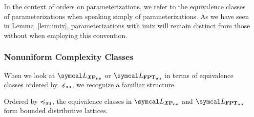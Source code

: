 In the context of orders on parameterizations, we refer to the equivalence classes of parameterizations when speaking simply of parameterizations.
As we have seen in Lemma~\ref{lem:imix}, parameterizations with imix will remain distinct from those without when employing this convention.

\subsubsection{Nonuniform Complexity Classes}
When we look at $\calL_\clXnu{P}$ or $\calL_\clnu{FPT}$ in terms of equivalence classes ordered by $\preccurlyeq_\mathrm{nu}$, we recognize a familiar \parencite{davey2002introduction} structure.
\begin{theorem}
\label{thm:nulattice}%
  Ordered by $\preccurlyeq_\mathrm{nu}$, the equivalence classes in $\calL_\clXnu{P}$ and $\calL_\clnu{FPT}$ form bounded distributive lattices.
\end{theorem}
